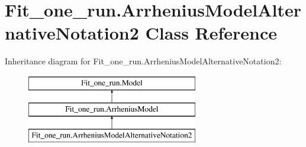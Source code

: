 \hypertarget{classFit__one__run_1_1ArrheniusModelAlternativeNotation2}{\section{\-Fit\-\_\-one\-\_\-run.\-Arrhenius\-Model\-Alternative\-Notation2 \-Class \-Reference}
\label{classFit__one__run_1_1ArrheniusModelAlternativeNotation2}
}
\-Inheritance diagram for \-Fit\-\_\-one\-\_\-run.\-Arrhenius\-Model\-Alternative\-Notation2\-:\begin{figure}[H]
\begin{center}
\leavevmode
\includegraphics[height=3.000000cm]{classFit__one__run_1_1ArrheniusModelAlternativeNotation2}
\end{center}
\end{figure}
